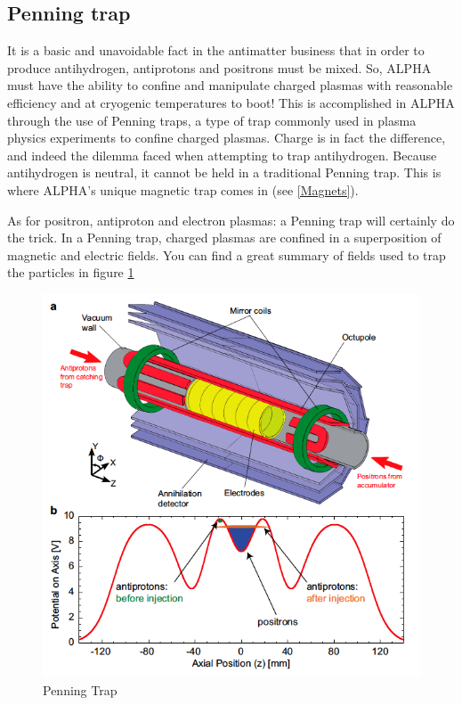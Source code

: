 \documentclass{article}
\begin{document}
\subsection{Penning trap}
It is a basic and unavoidable fact in the antimatter business that in order to produce antihydrogen, antiprotons and positrons must be mixed. So, ALPHA must have the ability to confine and manipulate charged plasmas with reasonable efficiency and at cryogenic temperatures to boot!
This is accomplished in ALPHA through the use of Penning traps, a type of trap commonly used in plasma physics experiments to confine charged plasmas. Charge is in fact the difference, and indeed the dilemma faced when attempting to trap antihydrogen. Because antihydrogen is neutral, it cannot be held in a traditional Penning trap. This is where ALPHA’s unique magnetic trap comes in (see \ref{Magnets}).

As for positron, antiproton and electron plasmas: a Penning trap will certainly do the trick. In a Penning trap, charged plasmas are confined in a superposition of magnetic and electric fields. You can find a great summary of fields used to trap the particles in figure \ref{trap}
\begin{figure}
\centering

\includegraphics[scale=0.4]{penning-trap-figure}
\caption{Penning Trap}
\label{trap}
\end{figure}
\end{document}
